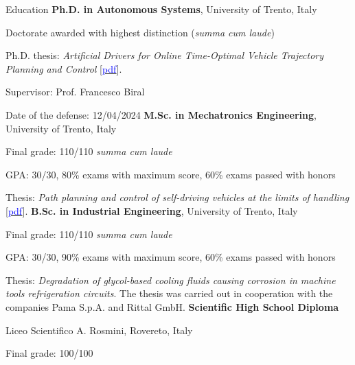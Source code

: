 \begin{rubric}{Education}
\entry*[11/2019 -- 04/2024]%
	\textbf{Ph.D. in Autonomous Systems}, University of Trento, Italy 
    \par Doctorate awarded with highest distinction (\textit{summa cum laude})
	\par Ph.D. thesis: \emph{Artificial Drivers for Online Time-Optimal Vehicle Trajectory Planning and Control} [\href{https://www.researchgate.net/publication/398814557_Artificial_Drivers_for_Online_Time-Optimal_Vehicle_Trajectory_Planning_and_Control}{\textcolor{blue}{pdf}}].
    \par Supervisor: Prof. Francesco Biral
    \par Date of the defense: 12/04/2024
%
\entry*[09/2017 -- 10/2019]%
	\textbf{M.Sc. in Mechatronics Engineering}, University of Trento, Italy
    \par Final grade: 110/110 \textit{summa cum laude}
    \par GPA: 30/30, \hspace{0.1cm}80\% exams with maximum score, \hspace{0.1cm}60\% exams passed with honors
    \par Thesis: \emph{Path planning and control of self-driving vehicles at the limits of handling} [\href{https://www.researchgate.net/publication/336880897_Path_Planning_and_Control_of_Self-Driving_Vehicles_at_the_Limits_of_Handling}{\textcolor{blue}{pdf}}].
% 
\entry*[09/2014 -- 09/2017]%
	\textbf{B.Sc. in Industrial Engineering}, University of Trento, Italy
    \par Final grade: 110/110 \textit{summa cum laude} \par GPA: 30/30, \hspace{0.1cm}90\% exams with maximum score, \hspace{0.1cm}60\% exams passed with honors
    \par Thesis: \emph{Degradation of glycol-based cooling fluids causing corrosion in machine tools refrigeration circuits}. The thesis was carried out in cooperation with the companies Pama S.p.A. and Rittal GmbH.
\entry*[09/2009 -- 06/2014]%
	\textbf{Scientific High School Diploma}
    \par Liceo Scientifico A. Rosmini, Rovereto, Italy
    \par Final grade: 100/100 
\end{rubric}